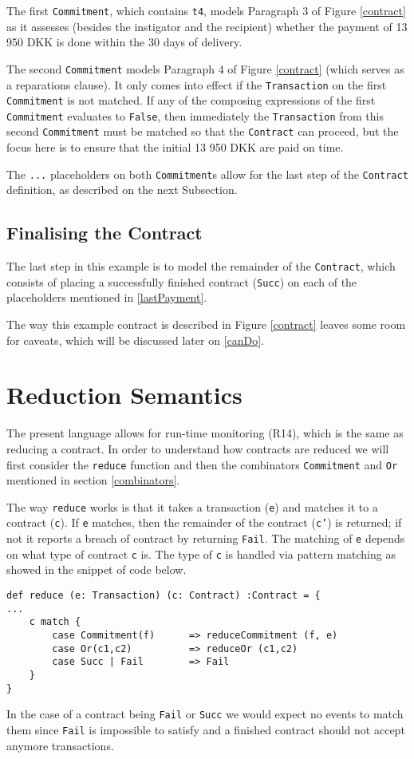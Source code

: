 \documentclass{ituthesis}
\begin{document}
The first \texttt{Commitment}, which contains \texttt{t4}, models Paragraph 3 of Figure \ref{contract} as it assesses (besides the instigator and the recipient) whether the payment of 13 950 DKK is done within the 30 days of delivery.

The second \texttt{Commitment} models Paragraph 4 of Figure \ref{contract} (which serves as a reparations clause). It only comes into effect if the \texttt{Transaction} on the first \texttt{Commitment} is not matched. If any of the composing expressions of the first \texttt{Commitment} evaluates to \texttt{False}, then immediately the \texttt{Transaction} from this second \texttt{Commitment} must be matched so that the \texttt{Contract} can proceed, but the focus here is to ensure that the initial 13 950 DKK are paid on time.

The \texttt{...} placeholders on both \texttt{Commitment}s allow for the last step of the \texttt{Contract} definition, as described on the next Subsection.

\subsection{Finalising the Contract} \label{finalizingContract}

The last step in this example is to model the remainder of the \texttt{Contract}, which consists of placing a successfully finished contract (\texttt{Succ}) on each of the placeholders mentioned in \ref{lastPayment}.

The way this example contract is described in Figure \ref{contract} leaves some room for caveats, which will be discussed later on \ref{canDo}.

\section{Reduction Semantics} \label{reduction}

The present language allows for run-time monitoring (R14), which is the same as reducing a contract. In order to understand how contracts are reduced we will first consider the \texttt{reduce} function and then the combinators \texttt{Commitment} and \texttt{Or} mentioned in section \ref{combinators}.

The way \texttt{reduce} works is that it takes a transaction (\texttt{e}) and matches it to a contract (\texttt{c}). If \texttt{e} matches, then the remainder of the contract (\texttt{c'}) is returned; if not it reports a breach of contract by returning \texttt{Fail}. The matching of \texttt{e} depends on what type of contract \texttt{c} is. The type of \texttt{c} is handled via pattern matching as showed in the snippet of code below.
\begin{lstlisting}
def reduce (e: Transaction) (c: Contract) :Contract = { 
...
    c match {
        case Commitment(f)      => reduceCommitment (f, e)
        case Or(c1,c2)          => reduceOr (c1,c2)
        case Succ | Fail        => Fail
    }
}
\end{lstlisting}
In the case of a contract being \texttt{Fail} or \texttt{Succ} we would expect no events to match them since \texttt{Fail} is impossible to satisfy and a finished contract should not accept anymore transactions.
\end{document}
